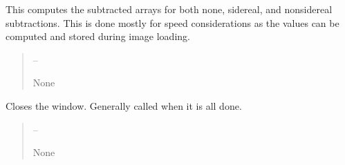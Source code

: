 \documentclass[letterpaper,11pt,english]{sphinxmanual}
\begin{document}
\begin{savenotes}
\begin{fulllineitems}
\begin{savenotes}\begin{fulllineitems}
\label{\detokenize{code/opihiexarata.gui.selector:opihiexarata.gui.selector.TargetSelectorWindow._recompute_subtraction_arrays}}
\pysigstartsignatures
{}
\pysigstopsignatures
\sphinxAtStartPar
This computes the subtracted arrays for both none, sidereal, and
non\sphinxhyphen{}sidereal subtractions. This is done mostly for speed considerations
as the values can be computed and stored during image loading.
\begin{quote}\begin{description}
\sphinxAtStartPar
{} – 

\sphinxAtStartPar
None

\end{description}\end{quote}

\end{fulllineitems}\end{savenotes}


\begin{savenotes}\begin{fulllineitems}
\label{\detokenize{code/opihiexarata.gui.selector:opihiexarata.gui.selector.TargetSelectorWindow.close_window}}
\pysigstartsignatures
{}
\pysigstopsignatures
\sphinxAtStartPar
Closes the window. Generally called when it is all done.
\begin{quote}\begin{description}
\sphinxAtStartPar
{} – 

\sphinxAtStartPar
None

\end{description}\end{quote}

\end{fulllineitems}\end{savenotes}


\end{fulllineitems}
\end{savenotes}
\end{document}
